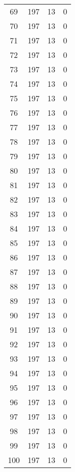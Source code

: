 \begin{longtable}[!]{c|ccc}
	69	& 197	& 13	& 0	\\
	70	& 197	& 13	& 0	\\
	71	& 197	& 13	& 0	\\
	72	& 197	& 13	& 0	\\
	73	& 197	& 13	& 0	\\
	74	& 197	& 13	& 0	\\
	75	& 197	& 13	& 0	\\
	76	& 197	& 13	& 0	\\
	77	& 197	& 13	& 0	\\
	78	& 197	& 13	& 0	\\
	79	& 197	& 13	& 0	\\
	80	& 197	& 13	& 0	\\
	81	& 197	& 13	& 0	\\
	82	& 197	& 13	& 0	\\
	83	& 197	& 13	& 0	\\
	84	& 197	& 13	& 0	\\
	85	& 197	& 13	& 0	\\
	86	& 197	& 13	& 0	\\
	87	& 197	& 13	& 0	\\
	88	& 197	& 13	& 0	\\
	89	& 197	& 13	& 0	\\
	90	& 197	& 13	& 0	\\
	91	& 197	& 13	& 0	\\
	92	& 197	& 13	& 0	\\
	93	& 197	& 13	& 0	\\
	94	& 197	& 13	& 0	\\
	95	& 197	& 13	& 0	\\
	96	& 197	& 13	& 0	\\
	97	& 197	& 13	& 0	\\
	98	& 197	& 13	& 0	\\
	99	& 197	& 13	& 0	\\
	100	& 197	& 13	& 0	\\
\end{longtable}


